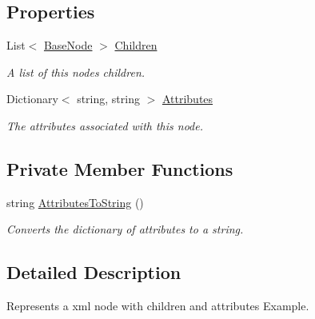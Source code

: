 \subsection*{Properties}
\begin{DoxyCompactItemize}
\item 
\hypertarget{class_x_m_leru_handleru_1_1_node_afa682372142a202eca56962f9ca4eb6a}{}List$<$ \hyperlink{class_x_m_leru_handleru_1_1_base_node}{Base\+Node} $>$ \hyperlink{class_x_m_leru_handleru_1_1_node_afa682372142a202eca56962f9ca4eb6a}{Children}\label{class_x_m_leru_handleru_1_1_node_afa682372142a202eca56962f9ca4eb6a}

\begin{DoxyCompactList}\small\item\em A list of this nodes children. \end{DoxyCompactList}\item 
\hypertarget{class_x_m_leru_handleru_1_1_node_a4d11bd34b693152c527f9add8997cea5}{}Dictionary$<$ string, string $>$ \hyperlink{class_x_m_leru_handleru_1_1_node_a4d11bd34b693152c527f9add8997cea5}{Attributes}\label{class_x_m_leru_handleru_1_1_node_a4d11bd34b693152c527f9add8997cea5}

\begin{DoxyCompactList}\small\item\em The attributes associated with this node. \end{DoxyCompactList}\end{DoxyCompactItemize}
\subsection*{Private Member Functions}
\begin{DoxyCompactItemize}
\item 
string \hyperlink{class_x_m_leru_handleru_1_1_node_aeb431cd29311f2a157930ae31cb61bf8}{Attributes\+To\+String} ()
\begin{DoxyCompactList}\small\item\em Converts the dictionary of attributes to a string. \end{DoxyCompactList}\end{DoxyCompactItemize}


\subsection{Detailed Description}
Represents a xml node with children and attributes Example. 


